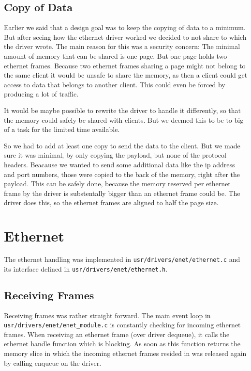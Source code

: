\subsection{Copy of Data}
Earlier we said that a design goal was to keep the copying of data to a minimum. But after seeing how the ethernet driver worked we decided to not share to which the driver wrote. The main reason for this was a security concern: The minimal amount of memory that can be shared is one page. But one page holds two ethernet frames. Because two ethernet frames sharing a page might not belong to the same client it would be unsafe to share the memory, as then a client could get access to data that belongs to another client. This could even be forced by producing a lot of traffic.

It would be maybe possible to rewrite the driver to handle it differently, so that the memory could safely be shared with clients. But we deemed this to be to big of a task for the limited time available.

So we had to add at least one copy to send the data to the client. But we made sure it was minimal, by only copying the payload, but none of the protocol headers. Beacause we wanted to send some additional data like the ip address and port numbers, those were copied to the back of the memory, right after the payload. This can be safely done, because the memory reserved per ethernet frame by the driver is substentally bigger than an ethernet frame could be. The driver does this, so the ethernet frames are aligned to half the page size.

\section{Ethernet}
The ethernet handling was implemented in \verb|usr/drivers/enet/ethernet.c| and its interface defined in \verb|usr/drivers/enet/ethernet.h|.

\subsection{Receiving Frames}
Receiving frames was rather straight forward. The main event loop in \verb|usr/drivers/enet/enet_module.c| is constantly checking for incoming ethernet frames. When receiving an ethernet frame (over driver dequeue), it calls the ethernet handle function which is blocking. As soon as this function returns the memory slice in which the incoming ethernet frames resided in was released again by calling enqueue on the driver.

